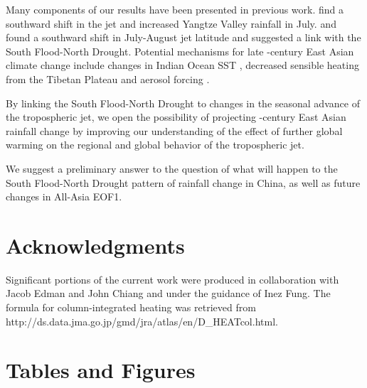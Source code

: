 	Many components of our results have been presented in previous work. \citet{Xuan2011} find a southward shift in the jet and increased Yangtze Valley rainfall in July. \citet{Yu2004} and \citet{Yu2007} found a southward shift in July-August jet latitude and suggested a link with the South Flood-North Drought. Potential mechanisms for late -century East Asian climate change include changes in Indian Ocean SST \citep{Qu2012}, decreased sensible heating from the Tibetan Plateau \citep{Liu2012a,Hu2015} and aerosol forcing \citep{Song2014}.
	
 By linking the South Flood-North Drought to changes in the seasonal advance of the tropospheric jet, we open the possibility of projecting -century East Asian rainfall change by improving our understanding of the effect of further global warming on the regional and global behavior of the tropospheric jet.
	
	
	We suggest a preliminary answer to the question of what will happen to the South Flood-North Drought pattern of rainfall change in China, as well as future changes in All-Asia EOF1.

	
\section{Acknowledgments}

	Significant portions of the current work were produced in collaboration with Jacob Edman and John Chiang and under the guidance of Inez Fung. The formula for column-integrated heating was retrieved from http://ds.data.jma.go.jp/gmd/jra/atlas/en/D_HEATcol.html.



\newpage	
\clearpage	
\section{Tables and Figures}




